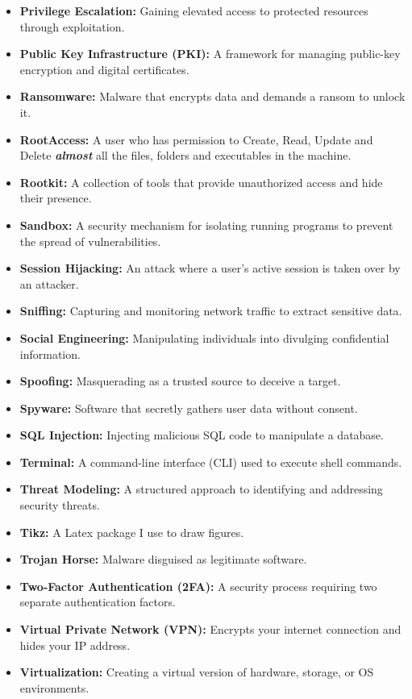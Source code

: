 \documentclass{article}
\begin{document}
\begin{itemize}
    \item \textbf{Privilege Escalation:} Gaining elevated access to protected resources through exploitation.
    \item \textbf{Public Key Infrastructure (PKI):} A framework for managing public-key encryption and digital certificates.
    \item \textbf{Ransomware:} Malware that encrypts data and demands a ransom to unlock it.
    \item \textbf{RootAccess:} A user who has permission to Create, Read, Update and Delete \textbf{\textit{almost}} all the files, folders and executables in the machine.
    \item \textbf{Rootkit:} A collection of tools that provide unauthorized access and hide their presence.
    \item \textbf{Sandbox:} A security mechanism for isolating running programs to prevent the spread of vulnerabilities.
    \item \textbf{Session Hijacking:} An attack where a user's active session is taken over by an attacker.
    \item \textbf{Sniffing:} Capturing and monitoring network traffic to extract sensitive data.
    \item \textbf{Social Engineering:} Manipulating individuals into divulging confidential information.
    \item \textbf{Spoofing:} Masquerading as a trusted source to deceive a target.
    \item \textbf{Spyware:} Software that secretly gathers user data without consent.
    \item \textbf{SQL Injection:} Injecting malicious SQL code to manipulate a database.
    \item \textbf{Terminal:} A command-line interface (CLI) used to execute shell commands.
    \item \textbf{Threat Modeling:} A structured approach to identifying and addressing security threats.
    \item \textbf{Tikz:} A Latex package I use to draw figures.
    \item \textbf{Trojan Horse:} Malware disguised as legitimate software.
    \item \textbf{Two-Factor Authentication (2FA):} A security process requiring two separate authentication factors.
    \item \textbf{Virtual Private Network (VPN):} Encrypts your internet connection and hides your IP address.
    \item \textbf{Virtualization:} Creating a virtual version of hardware, storage, or OS environments.

\end{itemize}
\end{document}
